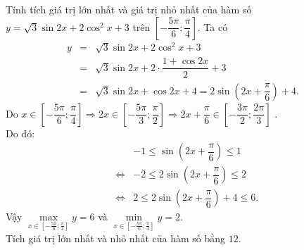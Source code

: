 \begin{ex}%
	Tính tích giá trị lớn nhất và giá trị nhỏ nhất của hàm số $y=\sqrt{3} \sin 2 x+2 \cos^2 x+3$ trên $\left[-\dfrac{5 \pi}{6}; \dfrac{\pi}{4}\right]$.
	\loigiai
	{Ta có
		\allowdisplaybreaks
		\begin{eqnarray*}
			y
			&=& \sqrt{3} \sin 2 x+2 \cos^2 x+3\\
			&=&\sqrt{3} \sin 2 x+2\cdot\dfrac{1+\cos 2x}{2}+3\\
			&=& \sqrt{3} \sin 2 x+\cos 2x+4=2\sin \left(2x+\dfrac{\pi}{6}\right)+4.
		\end{eqnarray*}
		Do $x\in \left[ -\dfrac{5 \pi}{6}; \dfrac{\pi}{4}\right]\Rightarrow 2x \in \left[-\dfrac{5 \pi}{3}; \dfrac{\pi}{2}\right] \Rightarrow 2x +\dfrac{\pi}{6}\in \left[-\dfrac{3\pi}{2}; \dfrac{2\pi}{3}\right]$ .\\
		Do đó: 
		\allowdisplaybreaks
		\begin{eqnarray*}
			& & -1\leq \sin \left(2x+\dfrac{\pi}{6}\right) \leq 1\\
			&\Leftrightarrow& -2\leq 2\sin \left(2x+\dfrac{\pi}{6}\right) \leq 2\\
			&\Leftrightarrow& 2\leq 2\sin \left(2x+\dfrac{\pi}{6}\right)+4 \leq 6.
		\end{eqnarray*}
		Vậy $\max\limits_{x \in \left[-\tfrac{5 \pi}{6}; \tfrac{\pi}{4}\right]} y=6$ và $\min\limits_{x \in \left[-\tfrac{5 \pi}{6}; \tfrac{\pi}{4}\right]} y=2$.\\
		Tích giá trị lớn nhất và nhỏ nhất của hàm số bằng $12$.
	}
\end{ex}


